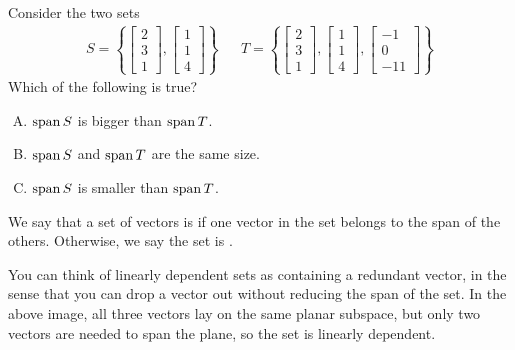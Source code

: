 \begin{activity}{10}
  Consider the two sets
  \begin{align*}
    S=\left\{
  \begin{bmatrix}2\\3\\1\end{bmatrix},
  \begin{bmatrix}1\\1\\4\end{bmatrix}
  \right\} & &
    T=\left\{
  \begin{bmatrix}2\\3\\1\end{bmatrix},
  \begin{bmatrix}1\\1\\4\end{bmatrix},
  \begin{bmatrix}-1\\0\\-11\end{bmatrix}
  \right\}
  \end{align*}
  Which of the following is true?

	\begin{enumerate}[(A)]
	\item \(\operatorname{span} S\) is bigger than \(\operatorname{span} T\).
	\item \(\operatorname{span} S\) and \(\operatorname{span} T\) are the same size.
	\item \(\operatorname{span} S\) is smaller than \(\operatorname{span} T\).
	\end{enumerate}

\end{activity}

\begin{definition}
  We say that a set of vectors is  if one vector
  in the set belongs to the span of the others. Otherwise, we say the set
  is .

  \begin{center}
  \end{center}

  You can think of linearly dependent sets as containing a redundant vector,
  in the sense that you can drop a vector out without reducing the span of the set. In the above image, all three vectors lay on the same planar subspace,
  but only two vectors are needed to span the plane, so the set is
  linearly dependent.
\end{definition}

